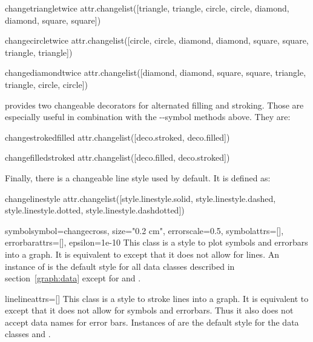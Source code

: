\begin{memberdesc}{changetriangletwice}
  attr.changelist([triangle, triangle, circle, circle, diamond, diamond, square, square])
\end{memberdesc}

\begin{memberdesc}{changecircletwice}
  attr.changelist([circle, circle, diamond, diamond, square, square, triangle, triangle])
\end{memberdesc}

\begin{memberdesc}{changediamondtwice}
  attr.changelist([diamond, diamond, square, square, triangle, triangle, circle, circle])
\end{memberdesc}

 provides two changeable decorators for alternated filling
and stroking. Those are especially useful in combination with the
--symbol methods above. They are:

\begin{memberdesc}{changestrokedfilled}
  attr.changelist([deco.stroked, deco.filled])
\end{memberdesc}

\begin{memberdesc}{changefilledstroked}
  attr.changelist([deco.filled, deco.stroked])
\end{memberdesc}

Finally, there is a changeable line style used by default. It is
defined as:

\begin{memberdesc}{changelinestyle}
  attr.changelist([style.linestyle.solid, style.linestyle.dashed, style.linestyle.dotted, style.linestyle.dashdotted])
\end{memberdesc}

\begin{classdesc}{symbol}{symbol=changecross, size="0.2 cm",
                          errorscale=0.5, symbolattrs=[],
                          errorbarattrs=[], epsilon=1e-10}
  This class is a style to plot symbols and errorbars into a graph. It
  is equivalent to  except that it does not allow
  for lines. An instance of  is the default style for
  all data classes described in section~\ref{graph:data} except for
   and .
\end{classdesc}

\begin{classdesc}{line}{lineattrs=[]}
  This class is a style to stroke lines into a graph. It is equivalent
  to  except that it does not allow for symbols and
  errorbars. Thus it also does not accept data names for error bars.
  Instances of  are the default style for the data classes
   and .
\end{classdesc}

